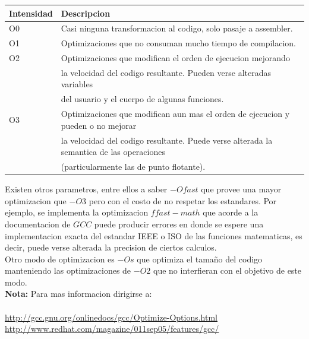 \begin{center}
    \begin{tabular}{|l|l|}
        \hline
          Intensidad  & Descripcion\\
          \hline
          O0  & Casi ninguna transformacion al codigo, solo pasaje a assembler.  \\
          \hline
          O1  & Optimizaciones que no consuman mucho tiempo de compilacion.   \\
          \hline
          O2  & Optimizaciones que modifican el orden de ejecucion mejorando \\
           &  la velocidad del codigo resultante. Pueden verse alteradas variables \\
           &  del usuario y el cuerpo de algunas funciones.   \\
          \hline
          O3  & Optimizaciones que modifican aun mas el orden de ejecucion y pueden o no mejorar  \\
           &  la velocidad del codigo resultante. Puede verse alterada la semantica de las operaciones \\
           &  (particularmente las de punto flotante).\\
        \hline
    \end{tabular}
\end{center}

Existen otros parametros, entre ellos a saber $-Ofast$ que provee una mayor optimizacion que $-O3$ pero con el costo de no respetar los estandares. Por ejemplo, se implementa la optimizacion $ffast-math$ que acorde a la documentacion de $GCC$ puede producir errores en donde se espere una implementacion exacta del estandar IEEE o ISO de las funciones matematicas, es decir, puede verse alterada la precision de ciertos calculos.\\

Otro modo de optimizacion es $-Os$ que optimiza el tamaño del codigo manteniendo las optimizaciones de $-O2$ que no interfieran con el objetivo de este modo.\\

\textbf{Nota:} Para mas informacion dirigirse a:\\
\\
  \url{http://gcc.gnu.org/onlinedocs/gcc/Optimize-Options.html}\\
  \url{http://www.redhat.com/magazine/011sep05/features/gcc/}\\
\\

